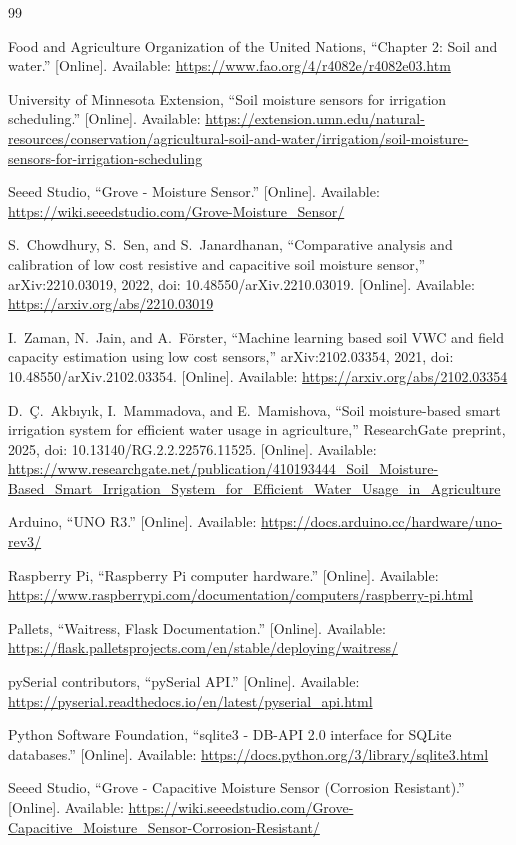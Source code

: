 \begin{thebibliography}{99}

Food and Agriculture Organization of the United Nations, ``Chapter 2: Soil and water.''
[Online]. Available: \url{https://www.fao.org/4/r4082e/r4082e03.htm}

University of Minnesota Extension, ``Soil moisture sensors for irrigation scheduling.''
[Online]. Available: \url{https://extension.umn.edu/natural-resources/conservation/agricultural-soil-and-water/irrigation/soil-moisture-sensors-for-irrigation-scheduling}

Seeed Studio, ``Grove - Moisture Sensor.''
[Online]. Available: \url{https://wiki.seeedstudio.com/Grove-Moisture_Sensor/}

S.~Chowdhury, S.~Sen, and S.~Janardhanan, ``Comparative analysis and calibration of low cost resistive and capacitive soil moisture sensor,'' arXiv:2210.03019, 2022, doi: 10.48550/arXiv.2210.03019.
[Online]. Available: \url{https://arxiv.org/abs/2210.03019}

I.~Zaman, N.~Jain, and A.~F{\"o}rster, ``Machine learning based soil VWC and field capacity estimation using low cost sensors,'' arXiv:2102.03354, 2021, doi: 10.48550/arXiv.2102.03354.
[Online]. Available: \url{https://arxiv.org/abs/2102.03354}

D.~{\c C}.~Akb{\i}y{\i}k, I.~Mammadova, and E.~Mamishova, ``Soil moisture-based smart irrigation system for efficient water usage in agriculture,'' ResearchGate preprint, 2025, doi: 10.13140/RG.2.2.22576.11525.
[Online]. Available: \url{https://www.researchgate.net/publication/410193444_Soil_Moisture-Based_Smart_Irrigation_System_for_Efficient_Water_Usage_in_Agriculture}

Arduino, ``UNO R3.''
[Online]. Available: \url{https://docs.arduino.cc/hardware/uno-rev3/}

Raspberry Pi, ``Raspberry Pi computer hardware.''
[Online]. Available: \url{https://www.raspberrypi.com/documentation/computers/raspberry-pi.html}

Pallets, ``Waitress, Flask Documentation.''
[Online]. Available: \url{https://flask.palletsprojects.com/en/stable/deploying/waitress/}

pySerial contributors, ``pySerial API.''
[Online]. Available: \url{https://pyserial.readthedocs.io/en/latest/pyserial_api.html}

Python Software Foundation, ``sqlite3 - DB-API 2.0 interface for SQLite databases.''
[Online]. Available: \url{https://docs.python.org/3/library/sqlite3.html}

Seeed Studio, ``Grove - Capacitive Moisture Sensor (Corrosion Resistant).''
[Online]. Available: \url{https://wiki.seeedstudio.com/Grove-Capacitive_Moisture_Sensor-Corrosion-Resistant/}
\end{thebibliography}
